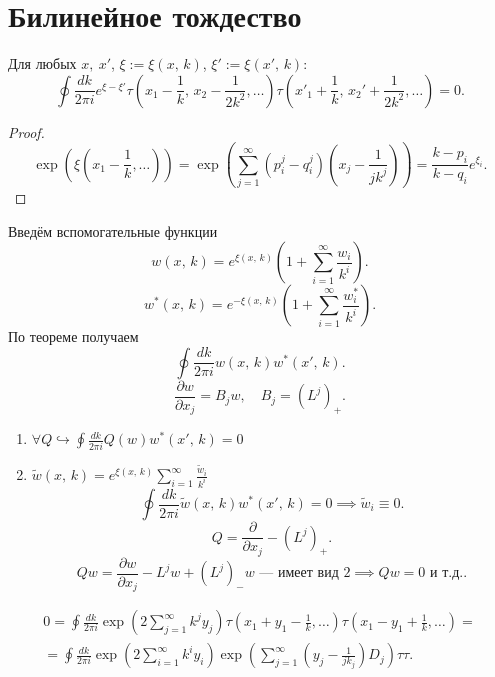 \documentclass[a4paper]{article}
\begin{document}
\section*{Билинейное тождество}
\begin{thm}
	Для любых $x,\ x'$, $\xi:= \xi (x,\,k)$, $\xi' := \xi (x',\,k)$:
	\[
		\oint \frac{dk}{2\pi i} e^{\xi-\xi'}\tau \left( 
		x_1- \frac{1}{k},\, x_2 - \frac{1}{2k^2},\ldots\right) \tau \left( x'_1 + \frac{1}{k},\,x_2' + \frac{1}{2k^2},\ldots \right) =0
	.\] 
\end{thm}
\begin{proof}
\[
	\exp \left(  \xi \left( x_1 - \frac{1}{k},\ldots \right)  \right) = \exp \left( \sum_{j=1}^{\infty} \left( p_i ^j -q_i^j \right) 
	\left( x_j - \frac{1}{j k^j} \right) \right) =
	\frac{k-p_i}{k-q_i}e^{\xi_i}
.\] 
\end{proof}
Введём вспомогательные функции
\[
	w(x,\,k)= e^{\xi (x,\,k)}\left( 1+ \sum_{i=1}^{\infty} \frac{w_i}{k^i} \right) 
.\] 
 \[
	w^*(x,\,k)= e^{-\xi (x,\,k)}\left( 1+ \sum_{i=1}^{\infty} \frac{w^*_i}{k^i} \right) 
.\]
По теореме получаем
\[
	\oint \frac{dk}{2\pi i} w (x,\,k) w^* (x',\,k)
.\] 
\[
	\frac{\partial w}{\partial x_j} =B_j w,\quad B_j =\left( L^j \right) _{+}
.\] 
\begin{enumerate}
\item $\displaystyle  \forall Q \hookrightarrow \oint
	\frac{dk}{2\pi i} Q(w) w^*(x',\,k)=0$
\item $\displaystyle \tilde{w} (x,\,k)= e^{\xi (x,\,k)} \sum_{i=1}^{\infty} \frac{\tilde{w}_i}{k^i}$ 
	\[
		\oint \frac{dk}{ 2\pi i} \tilde{w} (x,\,k) w^*(x',\,k)=0 \implies \tilde{w}_i \equiv 0
	.\] 
	\[
		Q= \frac{\partial }{\partial x_j} - (L^j)_+
	.\] 
	\[
		Qw= \frac{\partial w}{\partial x_j}- L^j w + (L^j)_-
		w \text{  --- имеет вид 2}\implies Qw=0 \text{ и т.д.}
	.\] 
\end{enumerate}
\begin{multline*}
	0 = \oint \frac{dk}{2\pi i } \exp \left( 
	2 \sum_{j=1}^{\infty} k^j y_j\right) \tau
	\left( x_1+ y_1 - \frac{1}{k},\ldots \right) \tau\left( 
	x_1- y_1+ \frac{1}{k},\ldots\right) =\\=
	\oint \frac{dk}{2\pi i} \exp \left( 2 \sum_{i=1}^{\infty} k^i
	y_i\right) \exp \left( \sum_{j=1}^{\infty} \left( y_j- \frac{1}{j k_j} \right) D_j \right) \tau\tau
.\end{multline*} 
\end{document}
